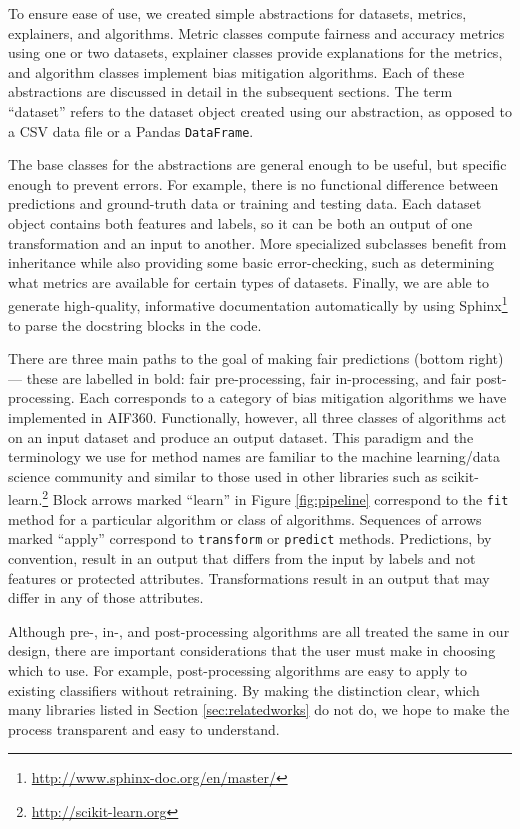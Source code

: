 \documentclass{article}
\begin{document}
To ensure ease of use, we created simple abstractions for datasets, metrics, explainers, and algorithms. Metric classes compute fairness and accuracy metrics using one or two datasets, explainer classes provide explanations for the metrics, and algorithm classes implement bias mitigation algorithms. Each of these abstractions are discussed in detail in the subsequent sections. The term ``dataset'' refers to the dataset object created using our abstraction, as opposed to a CSV data file or a Pandas \texttt{DataFrame}.

The base classes for the abstractions are general enough to be useful, but specific enough to prevent errors. For example, there is no functional difference between predictions and ground-truth data or training and testing data. Each dataset object contains both features and labels, so it can be both an output of one transformation and an input to another. More specialized subclasses benefit from inheritance while also providing some basic error-checking, such as determining what metrics are available for certain types of datasets. Finally, we are able to generate high-quality, informative documentation automatically by using Sphinx\footnote{\url{http://www.sphinx-doc.org/en/master/}} to parse the docstring blocks in the code.

There are three main paths to the goal of making fair predictions (bottom right) --- these are labelled in bold: fair pre-processing, fair in-processing, and fair post-processing. Each corresponds to a category of bias mitigation algorithms we have implemented in AIF360. Functionally, however, all three classes of algorithms act on an input dataset and produce an output dataset. This paradigm and the terminology we use for method names are familiar to the machine learning/data science community and similar to those used in other libraries such as scikit-learn.\footnote{\url{http://scikit-learn.org}} Block arrows marked ``learn'' in Figure \ref{fig:pipeline} correspond to the \texttt{fit} method for a particular algorithm or class of algorithms. Sequences of arrows marked ``apply'' correspond to \texttt{transform} or \texttt{predict} methods. Predictions, by convention, result in an output that differs from the input by labels and not features or protected attributes. Transformations result in an output that may differ in any of those attributes.

Although pre-, in-, and post-processing algorithms are all treated the same in our design, there are important considerations that the user must make in choosing which to use. For example, post-processing algorithms are easy to apply to existing classifiers without retraining. By making the distinction clear, which many libraries listed in Section \ref{sec:relatedworks} do not do, we hope to make the process transparent and easy to understand.
\end{document}
